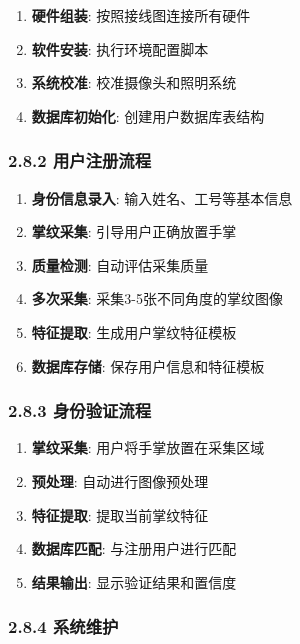 \begin{enumerate}
\def\labelenumi{\arabic{enumi}.}
\tightlist
\item
  \textbf{硬件组装}: 按照接线图连接所有硬件
\item
  \textbf{软件安装}: 执行环境配置脚本
\item
  \textbf{系统校准}: 校准摄像头和照明系统
\item
  \textbf{数据库初始化}: 创建用户数据库表结构
\end{enumerate}

\subsubsection{2.8.2
用户注册流程}\label{ux7528ux6237ux6ce8ux518cux6d41ux7a0b}

\begin{enumerate}
\def\labelenumi{\arabic{enumi}.}
\tightlist
\item
  \textbf{身份信息录入}: 输入姓名、工号等基本信息
\item
  \textbf{掌纹采集}: 引导用户正确放置手掌
\item
  \textbf{质量检测}: 自动评估采集质量
\item
  \textbf{多次采集}: 采集3-5张不同角度的掌纹图像
\item
  \textbf{特征提取}: 生成用户掌纹特征模板
\item
  \textbf{数据库存储}: 保存用户信息和特征模板
\end{enumerate}

\subsubsection{2.8.3
身份验证流程}\label{ux8eabux4efdux9a8cux8bc1ux6d41ux7a0b}

\begin{enumerate}
\def\labelenumi{\arabic{enumi}.}
\tightlist
\item
  \textbf{掌纹采集}: 用户将手掌放置在采集区域
\item
  \textbf{预处理}: 自动进行图像预处理
\item
  \textbf{特征提取}: 提取当前掌纹特征
\item
  \textbf{数据库匹配}: 与注册用户进行匹配
\item
  \textbf{结果输出}: 显示验证结果和置信度
\end{enumerate}

\subsubsection{2.8.4 系统维护}\label{ux7cfbux7edfux7ef4ux62a4}

